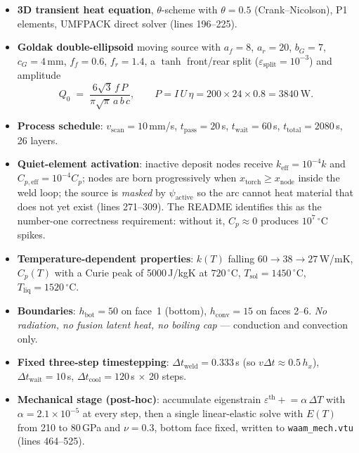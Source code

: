 \documentclass[10pt,a4paper]{article}
\newcommand{\code}[1]{\texttt{#1}}
\begin{document}
\begin{itemize}[leftmargin=1.4em,itemsep=0.15em]
    \item \textbf{3D transient heat equation}, $\theta$-scheme with
    $\theta = 0.5$ (Crank--Nicolson), P1 elements, UMFPACK direct solver
    (lines 196--225).
    \item \textbf{Goldak double-ellipsoid} moving source with
    $a_f = 8$, $a_r = 20$, $b_G = 7$, $c_G = 4$\,mm, $f_f = 0.6$,
    $f_r = 1.4$, a $\tanh$ front/rear split ($\varepsilon_{\text{split}} =
    10^{-3}$) and amplitude
    \begin{equation}
        Q_0 \;=\; \frac{6\sqrt{3}\,f\,P}{\pi\sqrt{\pi}\,a\,b\,c},
        \qquad P = I\,U\,\eta = 200 \times 24 \times 0.8 = 3840\ \text{W}.
        \label{eq:goldak}
    \end{equation}
    \item \textbf{Process schedule}: $v_{\text{scan}} = 10$\,mm/s,
    $t_{\text{pass}} = 20$\,s, $t_{\text{wait}} = 60$\,s,
    $t_{\text{total}} = 2080$\,s, 26 layers.
    \item \textbf{Quiet-element activation}: inactive deposit nodes receive
    $k_{\text{eff}} = 10^{-4}k$ and $C_{p,\text{eff}} = 10^{-4}C_p$; nodes are
    born progressively when $x_{\text{torch}} \ge x_{\text{node}}$ inside the
    weld loop; the source is \emph{masked} by $\psi_{\text{active}}$ so the arc
    cannot heat material that does not yet exist (lines 271--309). The README
    identifies this as the number-one correctness requirement: without it,
    $C_p \approx 0$ produces $10^{7}\,^\circ$C spikes.
    \item \textbf{Temperature-dependent properties}: $k(T)$ falling
    $60 \rightarrow 38 \rightarrow 27$\,W/mK, $C_p(T)$ with a Curie peak of
    5000\,J/kgK at $720\,^\circ$C, $T_{\text{sol}} = 1450\,^\circ$C,
    $T_{\text{liq}} = 1520\,^\circ$C.
    \item \textbf{Boundaries}: $h_{\text{bot}} = 50$ on face~1 (bottom),
    $h_{\text{conv}} = 15$ on faces 2--6. \emph{No radiation, no fusion latent
    heat, no boiling cap} --- conduction and convection only.
    \item \textbf{Fixed three-step timestepping}: $\Delta t_{\text{weld}} =
    0.333$\,s (so $v\Delta t \approx 0.5\,h_x$), $\Delta t_{\text{wait}} =
    10$\,s, $\Delta t_{\text{cool}} = 120$\,s $\times$ 20 steps.
    \item \textbf{Mechanical stage (post-hoc)}: accumulate eigenstrain
    $\varepsilon^{\text{th}} \mathrel{+}= \alpha\,\Delta T$ with
    $\alpha = 2.1\times10^{-5}$ at every step, then a single linear-elastic
    solve with $E(T)$ from 210 to 80\,GPa and $\nu = 0.3$, bottom face fixed,
    written to \code{waam\_mech.vtu} (lines 464--525).
\end{itemize}
\end{document}
